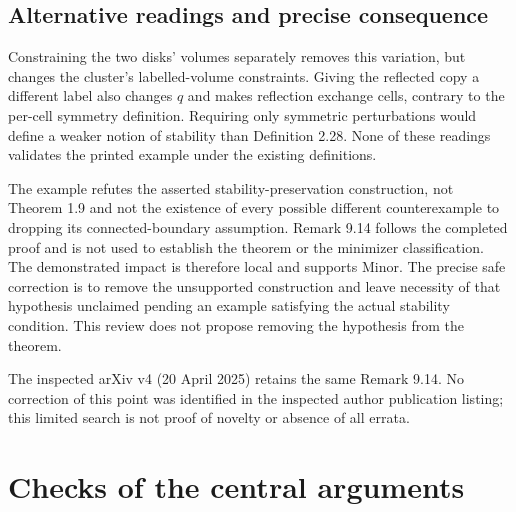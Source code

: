 \documentclass[10pt]{article}
\begin{document}
\subsection*{Alternative readings and precise consequence}
Constraining the two disks’ volumes separately removes this variation, but changes the cluster’s labelled-volume constraints. Giving the reflected copy a different label also changes \(q\) and makes reflection exchange cells, contrary to the per-cell symmetry definition. Requiring only symmetric perturbations would define a weaker notion of stability than Definition 2.28. None of these readings validates the printed example under the existing definitions.\par
The example refutes the asserted stability-preservation construction, not Theorem 1.9 and not the existence of every possible different counterexample to dropping its connected-boundary assumption. Remark 9.14 follows the completed proof and is not used to establish the theorem or the minimizer classification. The demonstrated impact is therefore local and supports Minor. The precise safe correction is to remove the unsupported construction and leave necessity of that hypothesis unclaimed pending an example satisfying the actual stability condition. This review does not propose removing the hypothesis from the theorem.\par
The inspected arXiv v4 (20 April 2025) retains the same Remark 9.14. No correction of this point was identified in the inspected author publication listing; this limited search is not proof of novelty or absence of all errata.\par
\section*{Checks of the central arguments}
\end{document}
